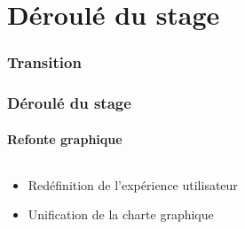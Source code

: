 \documentclass[aspectratio=169]{beamer}
\begin{document}
\section{Déroulé du stage}
\begin{frame}
    \frametitle{Transition}
    \framesubtitle{}
    \tableofcontents[currentsubsection,sectionstyle=show/shaded,subsectionstyle=show/shaded/hide]
\end{frame}
\begin{frame}
    \frametitle{Déroulé du stage}
    \framesubtitle{Refonte graphique}
    \begin{columns}
        \begin{column}{.4\textwidth}
            \parbox[c][0.8\textheight][c]{\columnwidth}{
                \begin{center}
                    \begin{itemize}
                        \item<2-> Redéfinition de l'expérience utilisateur
                        \item<3-> Unification de la charte graphique
                    \end{itemize}
                \end{center}
            }
        \end{column}
        \begin{column}{.55\textwidth}
            \parbox[c][0.8\textheight][c]{\columnwidth}{
                \begin{center}

\end{center}}
\end{column}
\end{columns}
\end{frame}
\end{document}
